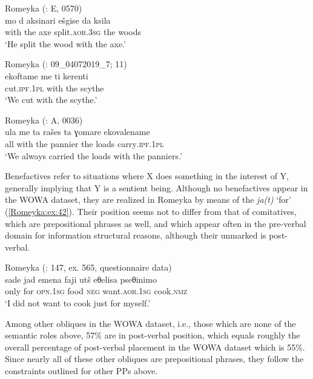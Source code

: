 \documentclass[output=paper,colorlinks,citecolor=brown]{langscibook}
\begin{document}
\ea\label{Romeyka:ex:39}
Romeyka (\citealt{schreiber2021pontic}: E, 0570) \\
\gll mo d aksinari ešgise da ksila \\
with the axe split\textsc{.aor.3sg} the woods \\
\glt `He split the wood with the axe.'  \\
\z

\ea\label{Romeyka:ex:40}
Romeyka (\citealt{schreiber_inprep}: 09\_04072019\_7; 11) \\
\gll ekoftame me ti kerenti \\
cut\textsc{.ipf.1pl} with the scythe \\
\glt `We cut with the scythe.'  \\
\z

\ea\label{Romeyka:ex:41}
Romeyka (\citealt{schreiber2021pontic}: A, 0036) \\
\gll ula me ta rašes ta ɣomare ekovalename  \\
all with the pannier the loads carry\textsc{.ipf.1pl} \\
\glt `We always carried the loads with the panniers.'  \\
\z

Benefactives refer to situations where X does something in the interest of Y, generally implying that Y is a sentient being. Although no benefactives appear in the WOWA dataset, they are realized in Romeyka by means of the  \textit{ja(t)} `for' (\ref{Romeyka:ex:42}). Their position seems not to differ from that of comitatives, which are prepositional phrases as well, and which appear often in the pre-verbal domain for information structural reasons, although their unmarked  is post-verbal.

\ea\label{Romeyka:ex:42}
Romeyka (\citealt{schreibergrammar2022}: 147, ex. 565, questionnaire data) \\
\gll sade jad emena faji utš eθelisa pseθinimo \\
only for \textsc{opn.1sg} food \textsc{neg} want\textsc{.aor.1sg} cook\textsc{.nmz} \\
\glt `I did not want to cook just for myself.'  \\
\z

Among other obliques in the WOWA dataset, i.e., those which are none of the semantic roles above, 57\% are in post-verbal position, which equals roughly the overall percentage of post-verbal placement in the WOWA dataset which is 55\%. Since nearly all of these other obliques are prepositional phrases, they follow the constraints outlined for other PPs above.
\end{document}

